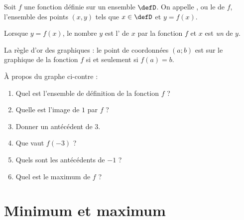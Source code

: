 \begin{definition}
Soit $f$ une fonction définie sur un ensemble $\defD$.
    On appelle , ou le  de $f$, l'ensemble des points $(x,y)$ tels que $x\in\defD$ et $y=f(x)$.

    Lorsque \( y=f(x)\), le nombre \( y\) est l' de \( x\) par la fonction \( f\) et \( x\) est \emph{un}  de \( y\).
\end{definition}


\begin{Aretenir}
    La règle d'or des graphiques : le point de coordonnées \( (a;b)\) est sur le graphique de la fonction \( f\) si et seulement si \( f(a)=b\).
\end{Aretenir}

\begin{multicols}{2}

À propos du graphe ci-contre :
\begin{enumerate}
    \item
        Quel est l'ensemble de définition de la fonction \( f\) ?
    \item
        Quelle est l'image de \( 1\) par \( f\) ?
    \item
        Donner un antécédent de \( 3\).
    \item
        Que vaut \( f(-3)\) ?
    \item
        Quels sont les antécédents de \( -1\) ?
    \item 
        Quel est le maximum de \( f\) ?
\end{enumerate}
    
    \columnbreak

\begin{center}
   
\end{center}

\end{multicols}

    \section{Minimum et maximum}


